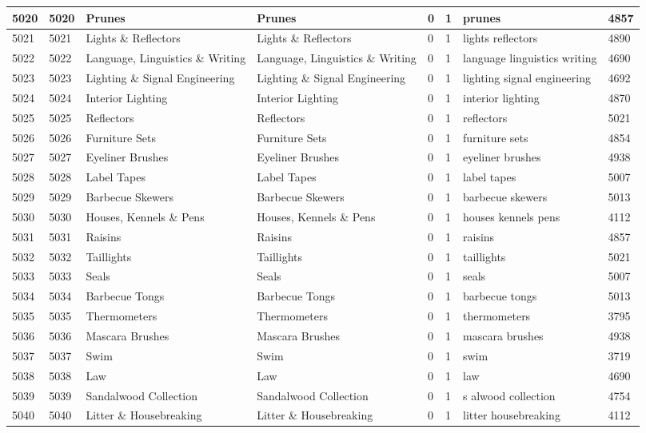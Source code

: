 \begin{longtable}{|l|l|l|l|l|l|l|l|}
5020 & 5020 & Prunes & Prunes & 0 & 1 & prunes & 4857 \\ \hline 
5021 & 5021 & Lights \& Reflectors & Lights \& Reflectors & 0 & 1 & lights reflectors & 4890 \\ \hline 
5022 & 5022 & Language, Linguistics \& Writing & Language, Linguistics \& Writing & 0 & 1 & language linguistics writing & 4690 \\ \hline 
5023 & 5023 & Lighting \& Signal Engineering & Lighting \& Signal Engineering & 0 & 1 & lighting signal engineering & 4692 \\ \hline 
5024 & 5024 & Interior Lighting & Interior Lighting & 0 & 1 & interior lighting & 4870 \\ \hline 
5025 & 5025 & Reflectors & Reflectors & 0 & 1 & reflectors & 5021 \\ \hline 
5026 & 5026 & Furniture Sets & Furniture Sets & 0 & 1 & furniture sets & 4854 \\ \hline 
5027 & 5027 & Eyeliner Brushes & Eyeliner Brushes & 0 & 1 & eyeliner brushes & 4938 \\ \hline 
5028 & 5028 & Label Tapes & Label Tapes & 0 & 1 & label tapes & 5007 \\ \hline 
5029 & 5029 & Barbecue Skewers & Barbecue Skewers & 0 & 1 & barbecue skewers & 5013 \\ \hline 
5030 & 5030 & Houses, Kennels \& Pens & Houses, Kennels \& Pens & 0 & 1 & houses kennels pens & 4112 \\ \hline 
5031 & 5031 & Raisins & Raisins & 0 & 1 & raisins & 4857 \\ \hline 
5032 & 5032 & Taillights & Taillights & 0 & 1 & taillights & 5021 \\ \hline 
5033 & 5033 & Seals & Seals & 0 & 1 & seals & 5007 \\ \hline 
5034 & 5034 & Barbecue Tongs & Barbecue Tongs & 0 & 1 & barbecue tongs & 5013 \\ \hline 
5035 & 5035 & Thermometers & Thermometers & 0 & 1 & thermometers & 3795 \\ \hline 
5036 & 5036 & Mascara Brushes & Mascara Brushes & 0 & 1 & mascara brushes & 4938 \\ \hline 
5037 & 5037 & Swim & Swim & 0 & 1 & swim & 3719 \\ \hline 
5038 & 5038 & Law & Law & 0 & 1 & law & 4690 \\ \hline 
5039 & 5039 & Sandalwood Collection & Sandalwood Collection & 0 & 1 & s alwood collection & 4754 \\ \hline 
5040 & 5040 & Litter \& Housebreaking & Litter \& Housebreaking & 0 & 1 & litter housebreaking & 4112 \\ \hline 

\end{longtable}
